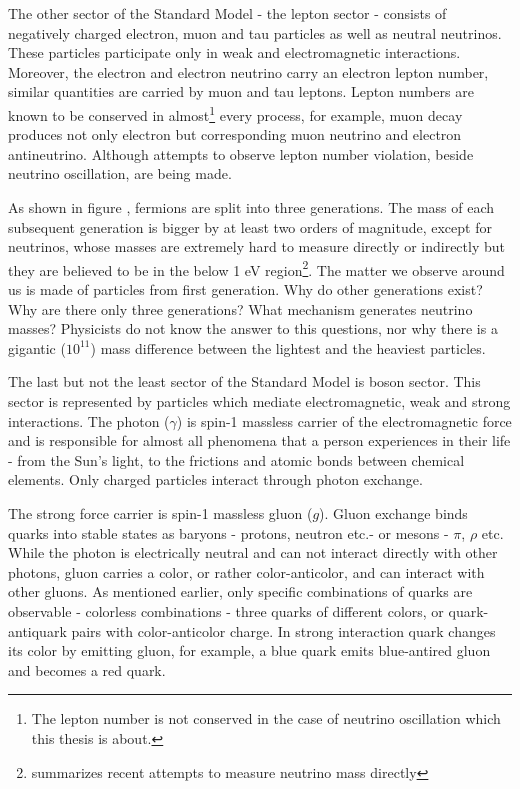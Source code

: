 The other sector of the Standard Model - the lepton sector - consists of negatively charged electron,
muon and tau particles as well as neutral neutrinos. These particles participate only in
weak and electromagnetic interactions. Moreover, the electron and electron neutrino carry an electron 
lepton number, similar quantities are carried by muon and tau leptons. Lepton numbers are known to be 
conserved in almost\footnote{The lepton number is not conserved in the case of neutrino oscillation which
this thesis is about.} every process, for example, muon decay produces not only electron but corresponding muon 
neutrino and electron antineutrino. Although attempts to observe lepton number violation, beside neutrino
oscillation, are being made.

As shown in figure , fermions are split into three generations. The mass of each 
subsequent generation is bigger by at least two orders of magnitude, except for neutrinos, whose 
masses are extremely hard to measure directly or indirectly but they are believed to be 
in the below 1 eV region\footnote{\cite{numass} summarizes recent attempts to measure neutrino mass directly}. 
The matter we observe around us is made of particles from first generation. Why do other generations exist? 
Why are there only three generations? What mechanism generates neutrino masses? Physicists do not know the answer 
to this questions, nor why there is a gigantic ($10^{11}$) mass difference between the lightest and the 
heaviest particles.

The last but not the least sector of the Standard Model is boson sector. This sector is 
represented by particles which mediate electromagnetic, weak and strong interactions. The photon
($\gamma$) is spin-1 massless carrier of the electromagnetic force and is responsible for almost all phenomena 
that a person experiences in their life - from the Sun's light, to the frictions and atomic bonds between 
chemical elements. Only charged particles interact through photon exchange.

The strong force carrier is spin-1 massless gluon ($g$). Gluon exchange binds quarks into stable states as
baryons - protons, neutron etc.- or mesons - $\pi$, $\rho$ etc. While the photon is electrically
neutral and can not interact directly with other photons, gluon carries a color, or
rather color-anticolor, and can interact with other gluons. As mentioned earlier, only specific 
combinations of quarks are observable - colorless combinations - three quarks of different colors,
or quark-antiquark pairs with color-anticolor charge. In strong interaction quark changes its color
by emitting gluon, for example, a blue quark emits blue-antired gluon and becomes a red quark.

